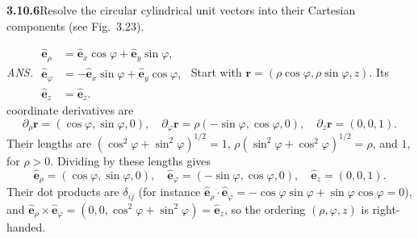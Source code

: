 \par\bigskip
\noindent\textbf{3.10.6}\quad Resolve the circular cylindrical unit vectors
into their Cartesian components (see Fig.~3.23).
\par\nobreak\hfill\emph{ANS.}\enspace
$\begin{aligned}
\hat{\mathbf{e}}_{\rho}&=\hat{\mathbf{e}}_{x}\cos\varphi
+\hat{\mathbf{e}}_{y}\sin\varphi,\\
\hat{\mathbf{e}}_{\varphi}&=-\hat{\mathbf{e}}_{x}\sin\varphi
+\hat{\mathbf{e}}_{y}\cos\varphi,\\
\hat{\mathbf{e}}_{z}&=\hat{\mathbf{e}}_{z}.
\end{aligned}$
\solution
Start with $\mathbf r=(\rho\cos\varphi,\rho\sin\varphi,z)$.
Its coordinate derivatives are
\[
\partial_\rho\mathbf r=(\cos\varphi,\sin\varphi,0),\quad
\partial_\varphi\mathbf r=\rho(-\sin\varphi,\cos\varphi,0),\quad
\partial_z\mathbf r=(0,0,1).
\]
Their lengths are
$(\cos^2\varphi+\sin^2\varphi)^{1/2}=1$,
$\rho(\sin^2\varphi+\cos^2\varphi)^{1/2}=\rho$, and $1$, for $\rho>0$.
Dividing by these lengths gives
\[
\boxed{\hat{\mathbf e}_\rho=(\cos\varphi,\sin\varphi,0),\quad
\hat{\mathbf e}_\varphi=(-\sin\varphi,\cos\varphi,0),\quad
\hat{\mathbf e}_z=(0,0,1)}.
\]
Their dot products are $\delta_{ij}$ (for instance
$\hat{\mathbf e}_\rho\cdot\hat{\mathbf e}_\varphi
=-\cos\varphi\sin\varphi+\sin\varphi\cos\varphi=0$), and
$\hat{\mathbf e}_\rho\times\hat{\mathbf e}_\varphi
=(0,0,\cos^2\varphi+\sin^2\varphi)=\hat{\mathbf e}_z$, so the
ordering $(\rho,\varphi,z)$ is right-handed.

